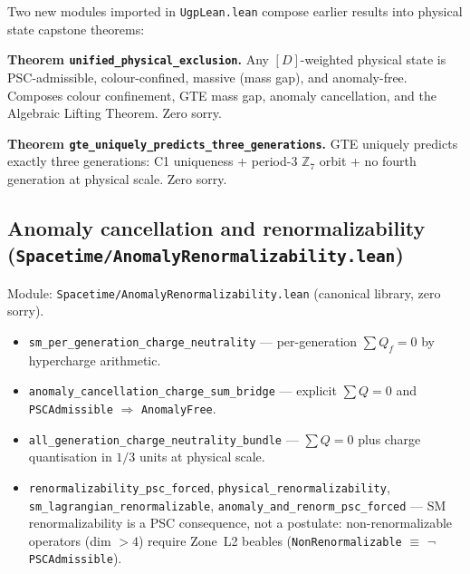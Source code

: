 \documentclass[11pt,a4paper]{article}
\newenvironment{keybox}[1]{%
  \Needspace*{8\baselineskip}%
  \begin{tcolorbox}[
    enhanced,
    breakable=false,
    colback=blue!5,
    colframe=blue!45!black,
    coltitle=black,
    colbacktitle=blue!14,
    boxrule=0.85pt,
    arc=2.5pt,
    left=9pt, right=9pt, top=6pt, bottom=6pt,
    titlerule=0.55pt,
    fonttitle=\bfseries,
    title={#1},
    before upper=\raggedright,
    before skip=0.9\baselineskip,
    after skip=0.9\baselineskip
  ]%
}{%
  \end{tcolorbox}%
}
\theoremstyle{definition}
\begin{document}
Two new modules imported in \texttt{UgpLean.lean} compose earlier results
into physical state capstone theorems:

\begin{keybox}{Unified Physical Exclusion
  (\texttt{Spacetime/PhysicalExclusion.lean})}
\textbf{Theorem \lstinline|unified_physical_exclusion|.}
Any $[D]$-weighted physical state is PSC-admissible, colour-confined,
massive (mass gap), and anomaly-free.  Composes colour confinement,
GTE mass gap, anomaly cancellation, and the Algebraic Lifting Theorem.
Zero sorry.
\end{keybox}

\begin{keybox}{Three-Generation Capstone
  (\texttt{Spacetime/ThreeGenerationCapstone.lean})}
\textbf{Theorem \lstinline|gte_uniquely_predicts_three_generations|.}
GTE uniquely predicts exactly three generations: C1 uniqueness +
period-3 $\mathbb{Z}_7$ orbit + no fourth generation at physical scale.
Zero sorry.
\end{keybox}

\subsection{Anomaly cancellation and renormalizability
  (\texttt{Spacetime/AnomalyRenormalizability.lean})}\label{subsec:anomaly-renorm}

Module: \texttt{Spacetime/AnomalyRenormalizability.lean} (canonical library, zero sorry).

\begin{itemize}[nosep]
\item \lstinline|sm_per_generation_charge_neutrality| — per-generation
  $\sum Q_f = 0$ by hypercharge arithmetic.
\item \lstinline|anomaly_cancellation_charge_sum_bridge| — explicit
  $\sum Q = 0$ and \lstinline|PSCAdmissible| $\Rightarrow$ \lstinline|AnomalyFree|.
\item \lstinline|all_generation_charge_neutrality_bundle| — $\sum Q = 0$
  plus charge quantisation in $1/3$ units at physical scale.
\item \lstinline|renormalizability_psc_forced|,
  \lstinline|physical_renormalizability|,
  \lstinline|sm_lagrangian_renormalizable|,
  \lstinline|anomaly_and_renorm_psc_forced| — SM renormalizability is a
  PSC consequence, not a postulate: non-renormalizable operators (dim $> 4$)
  require Zone~L2 beables (\lstinline|NonRenormalizable| $\equiv$
  $\neg$\lstinline|PSCAdmissible|).
\end{itemize}
\end{document}
